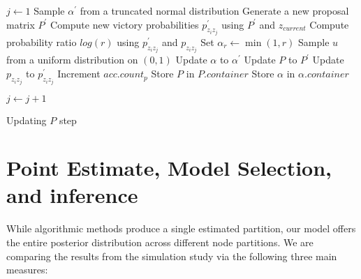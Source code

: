 \documentclass[11pt]{amsart}
\begin{document}
\begin{algorithm}
\begin{algorithmic}[1]
\State $j \gets 1$
\State Sample $\alpha^{\prime}$ from a truncated normal distribution
\State Generate a new proposal matrix $P^{\prime}$
\State Compute new victory probabilities $p_{z_iz_j}^{\prime}$ using $P^{\prime}$ and $z_{current}$
\State Compute probability ratio $log(r)$ using $p_{z_iz_j}^{\prime}$ and $p_{z_iz_j}$
\State Set $\alpha_{r} \gets \min(1, r)$
\State Sample $u$ from a uniform distribution on $(0,1)$
\State Update $\alpha$ to $\alpha^{\prime}$
\State Update $P$ to $P^{\prime}$
\State Update $p_{z_iz_j}$ to $p_{z_iz_j}^{\prime}$
\State Increment $acc.count_{p}$
\EndIf
\State Store $P$ in $P.container$
\State Store $\alpha$ in $\alpha.container$

\State $j \gets j+1$
\EndWhile
\end{algorithmic}
\label{alg:P_update}
\caption{Updating $P$ step}
\end{algorithm}


\clearpage

\section{Point Estimate, Model Selection,  and inference}

While algorithmic methods produce a single estimated partition, our model offers the entire posterior distribution across different node partitions. We are comparing the results from the simulation study via the following three main measures:
\end{document}
